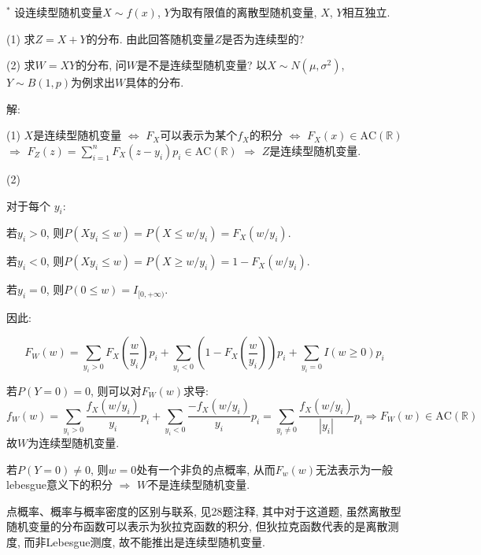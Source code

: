 \documentclass[standard]{ExBook}
\begin{document}
\begin{qitems}
\vspace{-5em}

    \begin{bbox}
    \begin{shaded}
        \qitem$^*$
设连续型随机变量$X\sim f(x)$, $Y$为取有限值的离散型随机变量, $X$, $Y$相互独立.

(1) 求$Z=X+Y$的分布. 由此回答随机变量$Z$是否为连续型的?

(2) 求$W=XY$的分布, 问$W$是不是连续型随机变量? 以$X\sim N(\mu,\sigma^2)$, $Y\sim B(1,p)$为例求出$W$具体的分布.
    \end{shaded}
    \end{bbox}

\vspace{-5em}

    \begin{bbox}
解: 

(1) $X$是连续型随机变量 $\Longleftrightarrow$ $F_{X}$可以表示为某个$f_{X}$的积分 $\Longleftrightarrow$ $F_{X}(x)\in \text{AC}(\mathbb{R})$ $\Longrightarrow$ $F_{Z}(z)=\sum\limits_{i=1}^{n}F_{X}(z-y_{i})p_{i}\in \text{AC}(\mathbb{R})$ $\Longrightarrow$ $Z$是连续型随机变量.

(2)

对于每个 $y_i$:

若$y_i > 0$, 则$P(X y_i \leq w) = P(X \leq w / y_i) = F_X(w / y_i)$.

若$y_i < 0$, 则$P(X y_i \leq w) = P(X \geq w / y_i) = 1 - F_X(w / y_i)$.

若$y_i = 0$, 则$P(0 \leq w) = I_{[0,+\infty)}$.

因此:

\[
F_W(w) = \sum_{y_i > 0} F_X\left(\frac{w}{y_i}\right) p_i + \sum_{y_i < 0} \left(1 - F_X\left(\frac{w}{y_i}\right)\right) p_i + \sum_{y_i = 0} I(w \geq 0) p_i
\]

若$P(Y=0)=0$, 则可以对$F_W(w)$求导:
\[
f_W(w) = \sum_{y_i > 0} \frac{f_X(w / y_i)}{y_i} p_i + \sum_{y_i < 0} \frac{-f_X(w / y_i)}{y_i} p_i=\sum_{y_i \neq 0} \frac{f_X(w / y_i)}{|y_i|} p_i
\Longrightarrow
F_{W}(w)\in \text{AC}(\mathbb{R})
\]
故$W$为连续型随机变量.

若$P(Y=0)\neq0$, 则$w=0$处有一个非负的点概率, 从而$F_{w}(w)$无法表示为一般lebesgue意义下的积分 $\Longrightarrow$ $W$不是连续型随机变量.

\textcolor{themeColor}{\selectfont {} 点概率、概率与概率密度的区别与联系, 见28题注释, 其中对于这道题, 虽然离散型随机变量的分布函数可以表示为狄拉克函数的积分, 但狄拉克函数代表的是离散测度, 而非Lebesgue测度, 故不能推出是连续型随机变量.}
    \end{bbox}


\end{qitems}
\end{document}
